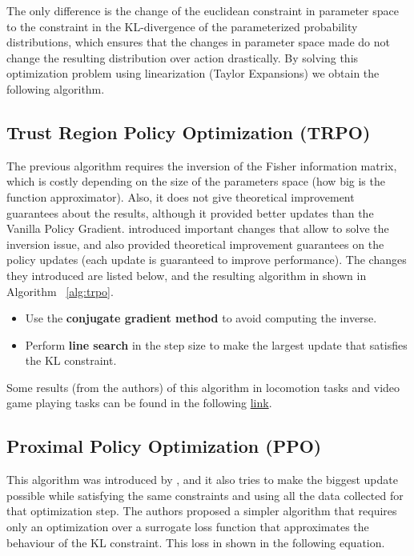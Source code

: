 The only difference is the change of the euclidean constraint in parameter space
to the constraint in the KL-divergence of the parameterized probability distributions,
which ensures that the changes in parameter space made do not change the resulting 
distribution over action drastically. By solving this optimization problem using
linearization (Taylor Expansions) we obtain the following algorithm.

\algNaturalPolicyGradients

\subsection{Trust Region Policy Optimization (TRPO)}

The previous algorithm requires the inversion of the Fisher information matrix, which
is costly depending on the size of the parameters space (how big is the function approximator).
Also, it does not give theoretical improvement guarantees about the results, although
it provided better updates than the Vanilla Policy Gradient. \cite{TRPO} introduced
important changes that allow to solve the inversion issue, and also provided theoretical 
improvement guarantees on the policy updates (each update is guaranteed to improve performance).
The changes they introduced are listed below, and the resulting algorithm in shown in
Algorithm ~\ref{alg:trpo}.

\begin{itemize}
    \item Use the \textbf{conjugate gradient method} to avoid computing the inverse.
    \item Perform \textbf{line search} in the step size to make the largest update
          that satisfies the KL constraint.
\end{itemize}

\algTRPO

Some results (from the authors) of this algorithm in locomotion tasks and video game playing tasks 
can be found in the following \href{https://youtu.be/jeid0wIrSn4}{link}.

\subsection{Proximal Policy Optimization (PPO)}

This algorithm was introduced by \cite{PPO}, and it also tries to make the biggest
update possible while satisfying the same constraints and using all the data collected
for that optimization step. The authors proposed a simpler algorithm that requires
only an optimization over a surrogate loss function that approximates the behaviour
of the KL constraint. This loss in shown in the following equation. 

